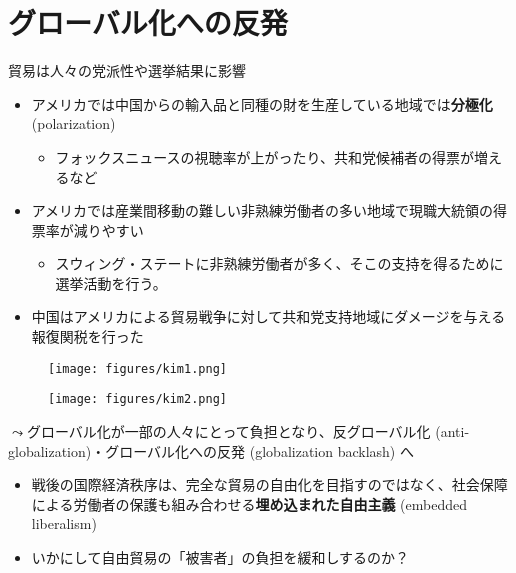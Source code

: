 \documentclass[
  xelatex,
  ja=standard]{bxjsarticle}
\providecommand{\tightlist}{%
  \setlength{\itemsep}{0pt}\setlength{\parskip}{0pt}}\usepackage{longtable,booktabs,array}
\begin{document}
\hypertarget{ux30b0ux30edux30fcux30d0ux30ebux5316ux3078ux306eux53cdux767a}{%
\section{グローバル化への反発}\label{ux30b0ux30edux30fcux30d0ux30ebux5316ux3078ux306eux53cdux767a}}

貿易は人々の党派性や選挙結果に影響

\begin{itemize}
\tightlist
\item
  アメリカでは中国からの輸入品と同種の財を生産している地域では\textbf{分極化}
  (polarization)\citep{autor2020}

  \begin{itemize}
  \tightlist
  \item
    フォックスニュースの視聴率が上がったり、共和党候補者の得票が増えるなど
  \end{itemize}
\item
  アメリカでは産業間移動の難しい非熟練労働者の多い地域で現職大統領の得票率が減りやすい\citep{jensen2017}

  \begin{itemize}
  \tightlist
  \item
    スウィング・ステートに非熟練労働者が多く、そこの支持を得るために選挙活動を行う。
  \end{itemize}
\item
  中国はアメリカによる貿易戦争に対して共和党支持地域にダメージを与える報復関税を行った\citep{kim2021}
\end{itemize}

\begin{figure}[htpb]

{\centering \texttt{[image: figures/kim1.png]}

}

\caption{\citet{kim2021}}

\end{figure}

\begin{figure}[htpb]

{\centering \texttt{[image: figures/kim2.png]}

}

\caption{\citet{kim2021}}

\end{figure}

\(\leadsto\)グローバル化が一部の人々にとって負担となり、反グローバル化
(anti-globalization)・グローバル化への反発 (globalization backlash) へ

\begin{itemize}
\tightlist
\item
  戦後の国際経済秩序は、完全な貿易の自由化を目指すのではなく、社会保障による労働者の保護も組み合わせる\textbf{埋め込まれた自由主義}
  (embedded liberalism)\citep{ruggie1982}
\item
  いかにして自由貿易の「被害者」の負担を緩和しするのか？
\end{itemize}


  
\end{document}
